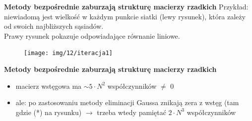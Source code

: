 \begin{frame}{}
  \textbf{Metody bezpośrednie zaburzają strukturę macierzy rzadkich}
  \newline Przykład: niewiadomą jest  wielkość w każdym punkcie siatki (lewy rysunek), która zależy od swoich najbliższych sąsiadów.\\
  Prawy rysunek pokazuje odpowiadające  równanie liniowe. %
  \begin{figure}
    \centering
    \texttt{[image: img/12/iteracja1]}
  \end{figure}
\end{frame}

\begin{frame}{}
  \begin{block}{\textbf{Metody bezpośrednie zaburzają strukturę macierzy rzadkich}}
    \begin{itemize}
      \item macierz wstęgowa ma {$\sim 5 \cdot N^2$ współczynników $\neq$ 0}
      \item{ale: po zastosowaniu metody eliminacji Gaussa znikają zera z wstęg (tam gdzie (*) na rysunku)
      \newline  $\rightarrow$ trzeba wtedy pamiętać $2 \cdot N^3$ współczynników}
    \end{itemize}
  \end{block}
\end{frame}

